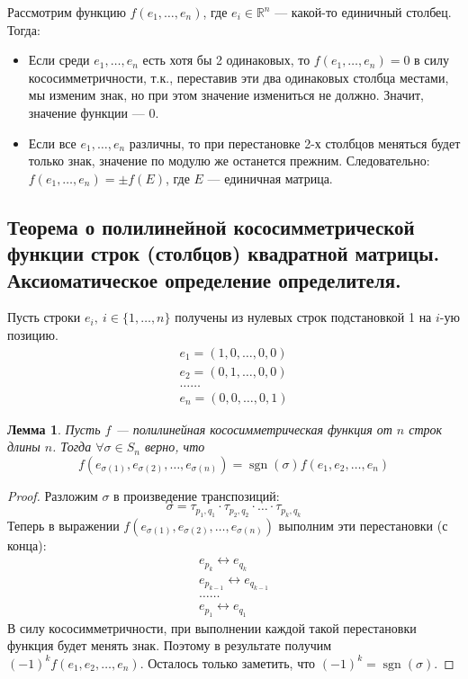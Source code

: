 \documentclass[a4paper, 12pt]{article}
\DeclareMathOperator{\sgn}{sgn}
\newtheorem*{que24lemma}{Лемма}
\begin{document}
Рассмотрим функцию $f(e_1, \ldots, e_n)$, где $e_i \in \mathbb{R}^n$ --- какой-то единичный столбец. Тогда:
\begin{itemize}
\item Если среди $e_1, \ldots, e_n$ есть хотя бы 2 одинаковых, то $f(e_1, \ldots, e_n) = 0$ в силу кососимметричности, т.к., переставив эти два одинаковых столбца местами, мы изменим знак, но при этом значение измениться не должно. Значит, значение функции --- $0$.
\item Если все $e_1, \ldots, e_n$ различны, то при перестановке 2-х столбцов меняться будет только знак, значение по модулю же останется прежним. Следовательно: $f(e_1, \ldots, e_n) = \pm f(E)$, где $E$ --- единичная матрица.
\end{itemize}

\subsection{Теорема о полилинейной кососимметрической функции строк (столбцов) квадратной матрицы. Аксиоматическое определение определителя.}
Пусть строки $e_i,\ i \in \{1, \ldots, n\}$ получены из нулевых строк подстановкой 1 на $i$-ую позицию.
\begin{gather*}
e_1 = (1, 0, \ldots, 0, 0) \\
e_2 = (0, 1, \ldots, 0, 0) \\
\ldots\ldots \\
e_n = (0, 0, \ldots, 0, 1)
\end{gather*}

\begin{que24lemma}
Пусть $f$ — полилинейная кососимметрическая функция от $n$ строк длины $n$. Тогда $\forall \sigma \in S_n$ верно, что
$$
f(e_{\sigma(1)}, e_{\sigma(2)}, \ldots, e_{\sigma(n)}) = \sgn(\sigma)f(e_1, e_2, \ldots, e_n)
$$
\end{que24lemma}

\begin{proof}
Разложим $\sigma$ в произведение транспозиций:
$$
\sigma = \tau_{p_1, q_1} \cdot \tau_{p_2, q_2} \cdot \ldots \cdot \tau_{p_k, q_k}
$$
Теперь в выражении $f(e_{\sigma(1)}, e_{\sigma(2)}, \ldots, e_{\sigma(n)})$ выполним эти перестановки (с конца):
\begin{gather*}
e_{p_k} \leftrightarrow e_{q_k} \\
e_{p_{k-1}} \leftrightarrow e_{q_{k-1}} \\
\ldots\ldots \\
e_{p_1} \leftrightarrow e_{q_1}
\end{gather*}
В силу кососимметричности, при выполнении каждой такой перестановки функция будет менять знак. Поэтому в результате получим $(-1)^k f(e_1, e_2, \ldots, e_n)$. Осталось только заметить, что $(-1)^k = \sgn(\sigma)$.
\end{proof}
\end{document}
